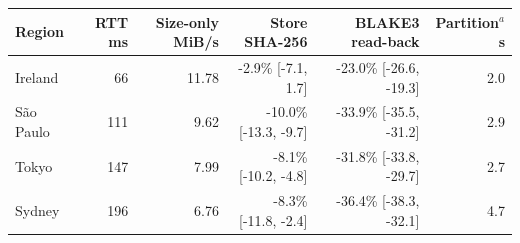 
\begin{tabular}{@{}lrrrrr@{}}
\toprule
Region & RTT ms & Size-only MiB/s & Store SHA-256 & BLAKE3 read-back & Partition$^a$ s \\
\midrule
Ireland & 66 & 11.78 & -2.9\% [-7.1, 1.7] & -23.0\% [-26.6, -19.3] & 2.0 \\
S\~ao Paulo & 111 & 9.62 & -10.0\% [-13.3, -9.7] & -33.9\% [-35.5, -31.2] & 2.9 \\
Tokyo & 147 & 7.99 & -8.1\% [-10.2, -4.8] & -31.8\% [-33.8, -29.7] & 2.7 \\
Sydney & 196 & 6.76 & -8.3\% [-11.8, -2.4] & -36.4\% [-38.3, -32.1] & 4.7 \\
\bottomrule
\end{tabular}
